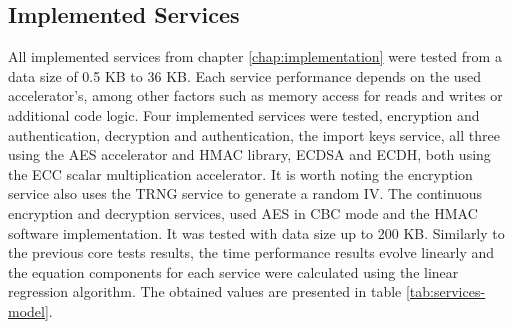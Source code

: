 \subsection{Implemented Services}\label{chap:evaluation:services}

All implemented services from chapter \ref{chap:implementation} were tested from a data size of 0.5 KB to 36 KB. Each service performance depends on the used accelerator's, among other factors such as memory access for reads and writes or additional code logic.
Four implemented services were tested, encryption and authentication, decryption and authentication, the import keys service, all three using the \ac{AES} accelerator and \ac{HMAC} library, \ac{ECDSA} and \ac{ECDH}, both using the \ac{ECC} scalar multiplication accelerator. It is worth noting the encryption service also uses the \ac{TRNG} service to generate a random \ac{IV}. The continuous encryption and decryption services, used AES in CBC mode and the HMAC software implementation. It was tested with data size up to 200 KB.
Similarly to the previous core tests results, the time performance results evolve linearly and the equation components for each service were calculated using the linear regression algorithm. The obtained values are presented in table \ref{tab:services-model}.



